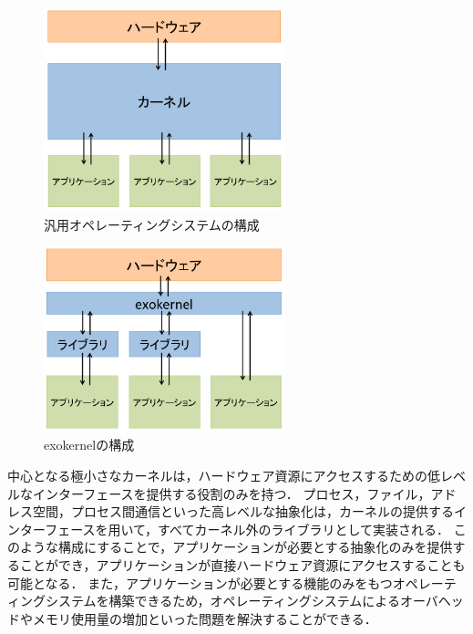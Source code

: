 \documentclass[graduation-thesis]{mlarticle}
\begin{document}
\begin{figure}[H]
  \begin{center}
    \includegraphics[width=7.0cm]{images/generalos.png}
    \caption{汎用オペレーティングシステムの構成}
    \label{fig:generalos}
  \end{center}
\end{figure}
\begin{figure}[H]
  \begin{center}
    \includegraphics[width=7.0cm]{images/exokernel.png}
    \caption{exokernelの構成}
    \label{fig:exokernel}
  \end{center}
\end{figure}


中心となる極小さなカーネルは，ハードウェア資源にアクセスするための低レベルなインターフェースを提供する役割のみを持つ．
プロセス，ファイル，アドレス空間，プロセス間通信といった高レベルな抽象化は，カーネルの提供するインターフェースを用いて，すべてカーネル外のライブラリとして実装される．
このような構成にすることで，アプリケーションが必要とする抽象化のみを提供することができ，アプリケーションが直接ハードウェア資源にアクセスすることも可能となる．
また，アプリケーションが必要とする機能のみをもつオペレーティングシステムを構築できるため，オペレーティングシステムによるオーバヘッドやメモリ使用量の増加といった問題を解決することができる．
\end{document}

